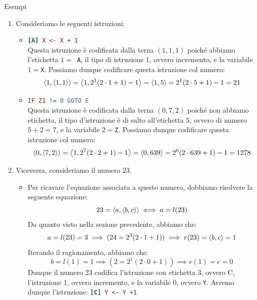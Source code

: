 \begin{generalbox}[colframe=azure-gradient-3!90!black]{Esempi}
  \begin{enumerate}
  \item Consideriamo le seguenti istruzioni:
  \begin{itemize}
    \item \lstinline[language=ini]{[A] X <- X + 1}\\
    Questa istruzione è codificata dalla terna \((1,1,1)\) poiché abbiamo l'etichetta \(1= \)\lstinline{ A}, il tipo di istruzione \(1\), ovvero incremento, e la variabile \(1=\)\lstinline{X}. Possiamo dunque codificare questa istruzione col numero:
    \begin{equation}
      \displaystyle{\left\langle{ 1,\displaystyle{\left\langle{ 1,1 }\right\rangle} }\right\rangle} = \displaystyle{\left\langle{ 1, 2^1(2\cdot 1+1)-1 }\right\rangle} = \displaystyle{\left\langle{ 1,5 }\right\rangle} = 2^1(2 \cdot 5 +1)-1=21
    \end{equation}
    \item \lstinline[language=ini]{IF Z1 != 0 GOTO E}\\ %
    Questa istruzione è codificata dalla terna \((0,7,2)\) poiché non abbiamo etichetta, il tipo d'istruzione è di salto all'etichetta \(5\), ovvero di numero \(5+2=7\), e la variabile \(2=\)\lstinline{Z}. Possiamo dunque codificare questa istruzione col numero:
    \begin{equation}
      \displaystyle{\left\langle{ 0,\displaystyle{\left\langle{ 7,2 }\right\rangle} }\right\rangle} = \displaystyle{\left\langle{ 1, 2^7(2\cdot 2+1)-1 }\right\rangle} = \displaystyle{\left\langle{ 0,639 }\right\rangle} = 2^0(2 \cdot 639 +1)-1=1278
    \end{equation}
  \end{itemize}
  \item Viceversa, consideriamo il numero \(23\).
    \begin{itemize}
      \item [] Per ricavare l'equazione associata a questo numero, dobbiamo risolvere la seguente equazione:
      \begin{equation}
          23=\displaystyle{\left\langle{ a,\displaystyle{\left\langle{ b,c }\right\rangle} }\right\rangle} \iff a=l(23)
      \end{equation}
      Da quanto visto nella sezione precedente, abbiamo che:
      \begin{equation}
        a = l(23) = 3 \implies (24=2^3(2\cdot 1+1))\implies r(23) = \displaystyle{\left\langle{ b,c }\right\rangle} = 1
      \end{equation}
      Iterando il ragionamento, abbiamo che:
      \begin{equation}
        b = l(1) = 1 \implies (2=2^1(2\cdot 0+1))\implies r(1) = c = 0
      \end{equation}
      Dunque il numero 23 codifica l'istruzione con etichetta \(3\), ovvero C, l'istruzione \(1\), ovvero incremento, e la variabile \(0\), ovvero \lstinline{Y}. Avremo dunque l'istruzione: \lstinline[language=ini]{[C] Y <- Y +1}
    \end{itemize}
  \end{enumerate}
\end{generalbox}

